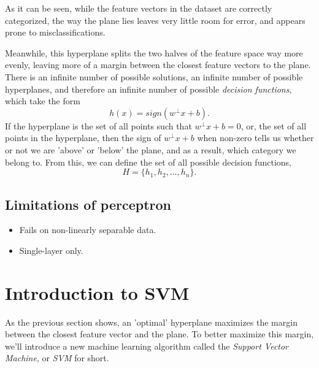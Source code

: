 As it can be seen, while the feature vectors in the dataset are correctly categorized, the way the plane lies leaves very little room for error, and appears prone to misclassifications.


Meanwhile, this hyperplane splits the two halves of the feature space way more evenly, leaving more of a margin between the closest feature vectors to the plane. There is an infinite number of possible solutions, an infinite number of possible hyperplanes, and therefore an infinite number of possible \textit{decision functions}, which take the form
\[
    h(x) = sign(w^\perp x+b).
\]
If the hyperplane is the set of all points such that $w^\perp x+b=0$, or, the set of all points in the hyperplane, then the sign of $w^\perp x+b$ when non-zero tells us whether or not we are 'above' or 'below' the plane, and as a result, which category we belong to. From this, we can define the set of all possible decision functions,
\[
    H = \{h_1, h_2, \dots, h_n\}.
\]

\subsection{Limitations of perceptron}
\begin{itemize}
    \item Fails on non-linearly separable data.
    \item Single-layer only.
\end{itemize}

\section{Introduction to SVM}
As the previous section shows, an 'optimal' hyperplane maximizes the margin between the closest feature vector and the plane. To better maximize this margin, we'll introduce a new machine learning algorithm called the \textit{Support Vector Machine}, or \textit{SVM} for short.

